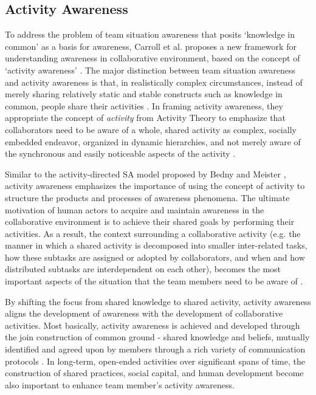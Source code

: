 \subsection{Activity Awareness} %
\label{sub:activity_awareness}
To address the problem of team situation awareness that posits `knowledge in common' as a basis for awareness, Carroll et al. proposes a new framework for understanding awareness in collaborative environment, based on the concept of `activity awareness' \cite{carroll2003a,carroll2006a}. The major distinction between team situation awareness and activity awareness is that, in realistically complex circumstances, instead of merely sharing relatively static and stable constructs such as knowledge in common, people share their activities \cite{carroll2006a}. In framing activity awareness, they appropriate the concept of \emph{activity} from Activity Theory to emphasize that collaborators need to be aware of a whole, shared activity as complex, socially embedded endeavor, organized in dynamic hierarchies, and not merely aware of the synchronous and easily noticeable aspects of the activity \cite{Carroll2009}. 

Similar to the activity-directed SA model proposed by Bedny and Meister \cite{Bedny1999}, activity awareness emphasizes the importance of using the concept of activity to structure the products and processes of awareness phenomena. The ultimate motivation of human actors to acquire and maintain awareness in the collaborative environment is to achieve their shared goals by performing their activities. As a result, the context surrounding a collaborative activity (e.g. the manner in which a shared activity is decomposed into smaller inter-related tasks, how these subtasks are assigned or adopted by collaborators, and when and how distributed subtasks are interdependent on each other), becomes the most important aspects of the situation that the team members need to be aware of \cite{carroll2003a}.

By shifting the focus from shared knowledge to shared activity, activity awareness aligns the development of awareness with the development of collaborative activities. Most basically, activity awareness is achieved and developed through the join construction of common ground - shared knowledge and beliefs, mutually identified and agreed upon by members through a rich variety of communication protocols \cite{carroll2006a}. In long-term, open-ended activities over significant spans of time, the construction of shared practices, social capital, and human development become also important to enhance team member's activity awareness.

